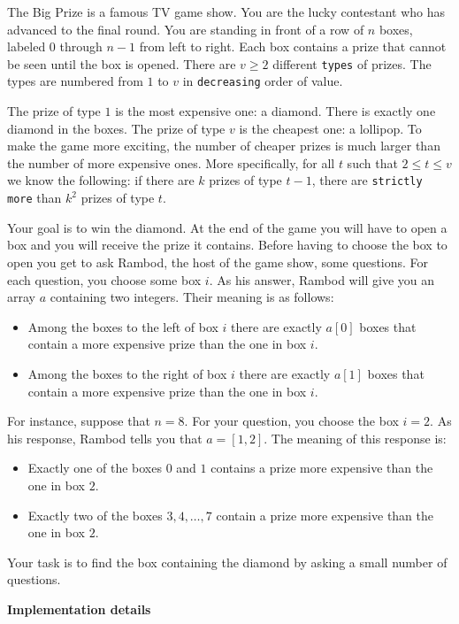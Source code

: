 The Big Prize is a famous TV game show. You are the lucky contestant who has advanced to the final round. You are standing in front of a row of $n$ boxes, labeled $0$ through $n - 1$ from left to right. Each box contains a prize that cannot be seen until the box is opened. There are $v \geq 2$ different \texttt{types} of prizes. The types are numbered from $1$ to $v$ in \texttt{decreasing} order of value.

The prize of type $1$ is the most expensive one: a diamond. There is exactly one diamond in the boxes. The prize of type $v$ is the cheapest one: a lollipop. To make the game more exciting, the number of cheaper prizes is much larger than the number of more expensive ones. More specifically, for all $t$ such that $2 \leq t \leq v$ we know the following: if there are $k$ prizes of type $t - 1$, there are \texttt{strictly more} than $k^2$ prizes of type $t$.

Your goal is to win the diamond. At the end of the game you will have to open a box and you will receive the prize it contains. Before having to choose the box to open you get to ask Rambod, the host of the game show, some questions. For each question, you choose some box $i$. As his answer, Rambod will give you an array $a$ containing two integers.
Their meaning is as follows:
\begin{itemize}
\item Among the boxes to the left of box $i$ there are exactly $a[0]$ boxes that contain a more expensive prize than the one in box $i$.
\item Among the boxes to the right of box $i$ there are exactly $a[1]$ boxes that contain a more expensive prize than the one in box $i$.
\end{itemize}

For instance, suppose that $n = 8$. For your question, you choose the box $i = 2$. As his response, Rambod tells you that $a = [1, 2]$. The meaning of this response is:
\begin{itemize}
\item Exactly one of the boxes $0$ and $1$ contains a prize more expensive than the one in box $2$.
\item Exactly two of the boxes $3, 4, \ldots, 7$ contain a prize more expensive than the one in box $2$.
\end{itemize}

Your task is to find the box containing the diamond by asking a small number of questions.

\textbf{Implementation details}

